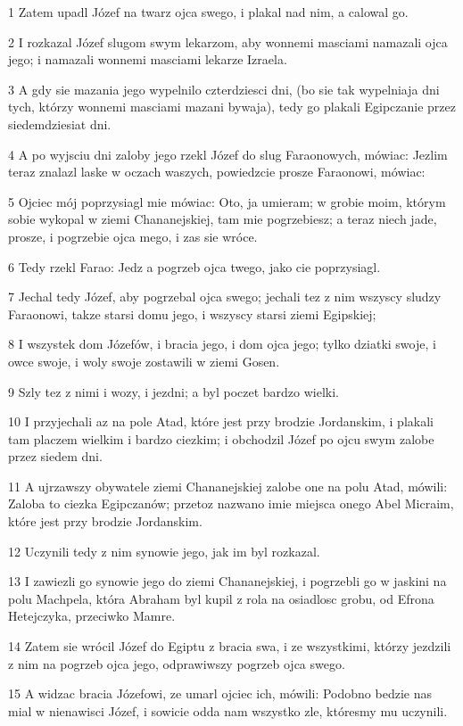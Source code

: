 \par 1 Zatem upadl Józef na twarz ojca swego, i plakal nad nim, a calowal go.
\par 2 I rozkazal Józef slugom swym lekarzom, aby wonnemi masciami namazali ojca jego; i namazali wonnemi masciami lekarze Izraela.
\par 3 A gdy sie mazania jego wypelnilo czterdziesci dni, (bo sie tak wypelniaja dni tych, którzy wonnemi masciami mazani bywaja), tedy go plakali Egipczanie przez siedemdziesiat dni.
\par 4 A po wyjsciu dni zaloby jego rzekl Józef do slug Faraonowych, mówiac: Jezlim teraz znalazl laske w oczach waszych, powiedzcie prosze Faraonowi, mówiac:
\par 5 Ojciec mój poprzysiagl mie mówiac: Oto, ja umieram; w grobie moim, którym sobie wykopal w ziemi Chananejskiej, tam mie pogrzebiesz; a teraz niech jade, prosze, i pogrzebie ojca mego, i zas sie wróce.
\par 6 Tedy rzekl Farao: Jedz a pogrzeb ojca twego, jako cie poprzysiagl.
\par 7 Jechal tedy Józef, aby pogrzebal ojca swego; jechali tez z nim wszyscy sludzy Faraonowi, takze starsi domu jego, i wszyscy starsi ziemi Egipskiej;
\par 8 I wszystek dom Józefów, i bracia jego, i dom ojca jego; tylko dziatki swoje, i owce swoje, i woly swoje zostawili w ziemi Gosen.
\par 9 Szly tez z nimi i wozy, i jezdni; a byl poczet bardzo wielki.
\par 10 I przyjechali az na pole Atad, które jest przy brodzie Jordanskim, i plakali tam placzem wielkim i bardzo ciezkim; i obchodzil Józef po ojcu swym zalobe przez siedem dni.
\par 11 A ujrzawszy obywatele ziemi Chananejskiej zalobe one na polu Atad, mówili: Zaloba to ciezka Egipczanów; przetoz nazwano imie miejsca onego Abel Micraim, które jest przy brodzie Jordanskim.
\par 12 Uczynili tedy z nim synowie jego, jak im byl rozkazal.
\par 13 I zawiezli go synowie jego do ziemi Chananejskiej, i pogrzebli go w jaskini na polu Machpela, która Abraham byl kupil z rola na osiadlosc grobu, od Efrona Hetejczyka, przeciwko Mamre.
\par 14 Zatem sie wrócil Józef do Egiptu z bracia swa, i ze wszystkimi, którzy jezdzili z nim na pogrzeb ojca jego, odprawiwszy pogrzeb ojca swego.
\par 15 A widzac bracia Józefowi, ze umarl ojciec ich, mówili: Podobno bedzie nas mial w nienawisci Józef, i sowicie odda nam wszystko zle, któresmy mu uczynili.

